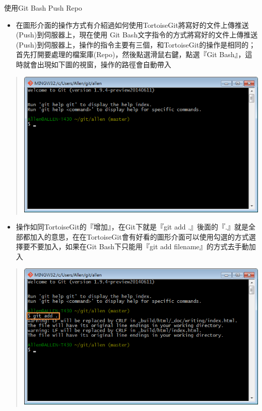 \documentclass[letterpaper,10pt,english]{sphinxmanual}
\begin{document}
使用Git Bash Push Repo
\begin{itemize}
\item {} 
在圖形介面的操作方式有介紹過如何使用TortoiseGit將寫好的文件上傳推送(Push)到伺服器上，現在使用 Git Bash文字指令的方式將寫好的文件上傳推送(Push)到伺服器上，操作的指令主要有三個，和TortoiseGit的操作是相同的；首先打開要處理的檔案庫(Repo)，然後點選滑鼠右鍵，點選『Git Bash』，這時就會出現如下圖的視窗，操作的路徑會自動帶入

\end{itemize}
\begin{quote}

\includegraphics{gitBash-push-001.png}
\end{quote}
\begin{itemize}
\item {} 
操作如同TortoiseGit的『增加』，在Git下就是『git add .』後面的『.』就是全部都加入的意思，在在TortoiseGit會有好看的圖形介面可以使用勾選的方式選擇要不要加入，如果在Git Bash下只能用『git add filename』的方式去手動加入

\end{itemize}
\begin{quote}

\includegraphics{gitBash-push-002.png}
\end{quote}
\end{document}
